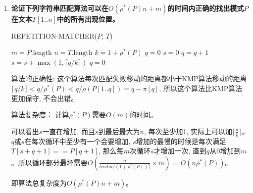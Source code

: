 \documentclass[paper=a4, fontsize=11pt]{scrartcl} %
\numberwithin{equation}{section} %
\numberwithin{figure}{section} %
\numberwithin{table}{section} %
\begin{document}
\begin{enumerate}[a]
\item \textbf{论证下列字符串匹配算法可以在$O(\rho^{*}(P)n + m)$的时间内正确的找出模式$P$在文本$T[1..n]$中的所有出现位置。}
  \begin{algorithm}[H]
  \caption{REPETITION-MATCHER($P$, $T$)}
  \label{algo:2-1}
  \begin{algorithmic}
    \State $m = P.\mbox{length}$
    \State $n = T.\mbox{length}$
    \State $k = 1 + \rho^{*}(P)$
    \State $q = 0$
    \State $s = 0$
    \State $q = q + 1$
    \EndIf
    \EndIf
    \State $s = s + \max(1, \lceil q/k \rceil)$
    \State $q = 0$
    \EndIf
    \EndWhile
  \end{algorithmic}
\end{algorithm}
  算法的正确性: 这个算法每次匹配失败移动的距离都小于KMP算法移动的距离$\lceil q/k \rceil < q / \rho^{*}(P) < q / \rho(P[1..q]) = q - \pi[q]$, 所以这个算法比KMP算法更加保守, 不会出错。

  算法复杂度： 计算$\rho^{*}(P)$需要$O(m)$的时间。

  可以看出$s$一直在增加, 而且$s$到最后最大为$n$, 每次至少加1, 实际上可以加$\lceil \frac{a}{k} \rceil$。 $q$或$s$在每次循环中至少有一个会要增加, $s$增加的最慢的时候是每次满足$T[s+q+1] == P[q+1]$, 那么每$m$次循环$s$才增加一次, 直到$q$从$0$增加到$m$。所以循环部分最坏需要$O(\frac{n}{lceil m / (1 + \rho^{*}(P)) \rceil} \times m)$ = $O(n\rho^{*}(P))$。

  即算法总复杂度为$O(\rho^{*}(P)n + m)$。
\end{enumerate}
\end{document}
